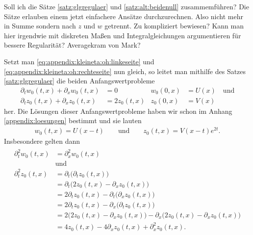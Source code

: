 \begin{note}
Soll ich die Sätze \ref{satz:glgregulaer} und \ref{satz:alt:beidenull} zusammemführen?
Die Sätze erlauben einem jetzt einfachere Ansätze durchzurechnen.
Also nicht mehr in Summe sondern nach $z$ und $w$ getrennt. 
Zu kompliziert bewiesen? Kann man hier irgendwie mit diskreten Maßen und Integralgleichungen argumentieren für bessere Regularität?
Averagekram von Mark?
\end{note}

Setzt man \eqref{eq:appendix:kleineta:oh:linkeseite} und \eqref{eq:appendix:kleineta:oh:rechteseite} nun gleich, so leitet man mithilfe des Satzes \ref{satz:glgregulaer} die beiden Anfangswertprobleme
\begin{align}\label{eq:appendix:kleineta:oh}
\partial_t w_0(t,x) + \partial_x w_0(t,x) &= 0 &w_0(0,x) &= U(x) \quad \text{und}\\
\partial_t z_0(t,x) + \partial_x z_0(t,x) &= 2 z_0(t,x)  &z_0(0,x) &= V(x) 
\end{align}
her. Die Lösungen dieser Anfangswertprobleme haben wir schon im Anhang \ref{appendix:loesungen} bestimmt und sie lauten
\begin{align}
w_0(t,x) = U(x - t) \qquad \text{und} \qquad z_0(t,x) = V(x - t) e^{2 t}.
\end{align}
Insbesondere gelten dann
\begin{align}\label{eq:appendix:kleineta:korollar:h2}
\begin{split}
\partial^2_t w_0(t,x) &= \partial^2_x w_0(t,x)\qquad\\&\text{und}\\
\partial^2_t z_0(t,x) &= \partial_t \bigl( \partial_t z_0(t,x) \bigr)\\
&= \partial_t \bigl( 2z_0(t,x)  - \partial_x z_0(t,x) \bigr)\\
&= 2 \partial_t z_0(t,x) - \partial_t \bigl( \partial_x z_0(t,x) \bigr)\\
&= 2 \partial_t z_0(t,x) - \partial_x \bigl( \partial_t z_0(t,x) \bigr)\\
&= 2 \bigl( 2z_0(t,x) - \partial_x z_0(t,x) \bigr) - \partial_x \bigl( 2 z_0(t,x) - \partial_x z_0(t,x) \bigr)\\
&= 4 z_0(t,x) - 4 \partial_x z_0(t,x) + \partial^2_x z_0(t,x).
\end{split}
\end{align}

